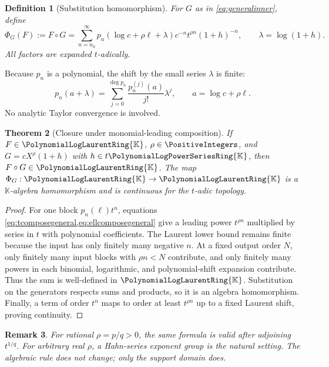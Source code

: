 \documentclass[11pt,oneside,openany]{book}
\newtheorem{theorem}{Theorem}[chapter]
\newtheorem{definition}[theorem]{Definition}
\newtheorem{remark}[theorem]{Remark}
\newcommand{\K}{\mathbb{K}}
\newcommand{\Rring}{\PolynomialLogPowerSeriesRing{\K}}
\newcommand{\Pring}{\PolynomialLogLaurentRing{\K}}
\newcommand{\compose}{\mathbin{\circ}}
\begin{document}
\begin{definition}[Substitution homomorphism]\label{def:PhiG}
For \(G\) as in \cref{eq:generalinner}, define
\begin{equation}\label{eq:PhiG}
 \Phi_G(F):=F\compose G
 =\sum_{n=n_0}^{\infty}
 p_n\!\left(\log c+\rho\ell+\lambda\right)
 c^{-n}t^{\rho n}(1+h)^{-n},
 \qquad
 \lambda=\log(1+h).
\end{equation}
All factors are expanded \(t\)-adically.
\end{definition}

Because \(p_n\) is a polynomial, the shift by the small series \(\lambda\) is
finite:
\begin{equation}\label{eq:polyshift}
 p_n(a+\lambda)
 =\sum_{j=0}^{\deg p_n}
   \frac{p_n^{(j)}(a)}{j!}\lambda^j,
 \qquad a=\log c+\rho\ell.
\end{equation}
No analytic Taylor convergence is involved.

\begin{theorem}[Closure under monomial-leading composition]
\label{thm:compositionclosure}
If \(F\in\Pring\), \(\rho\in\PositiveIntegers\), and
\(G=cX^\rho(1+h)\) with \(h\in t\Rring\), then
\(F\compose G\in\Pring\).  The map \(\Phi_G:\Pring\to\Pring\) is a
\(\K\)-algebra homomorphism and is continuous for the \(t\)-adic topology.
\end{theorem}

\begin{proof}
For one block \(p_n(\ell)t^n\), equations
\cref{eq:tcomposegeneral,eq:ellcomposegeneral} give a leading power
\(t^{\rho n}\) multiplied by series in \(t\) with polynomial coefficients.
The Laurent lower bound remains finite because the input has only finitely many
negative \(n\).  At a fixed output order \(N\), only finitely many input blocks
with \(\rho n<N\) contribute, and only finitely many powers in each binomial,
logarithmic, and polynomial-shift expansion contribute.  Thus the sum is
well-defined in \(\Pring\).  Substitution on the generators respects sums and
products, so it is an algebra homomorphism.  Finally, a term of order \(t^n\)
maps to order at least \(t^{\rho n}\) up to a fixed Laurent shift, proving
continuity.
\end{proof}

\begin{remark}
For rational \(\rho=p/q>0\), the same formula is valid after adjoining
\(t^{1/q}\).  For arbitrary real \(\rho\), a Hahn-series exponent group is the
natural setting.  The algebraic rule does not change; only the support domain
does.
\end{remark}
\end{document}
